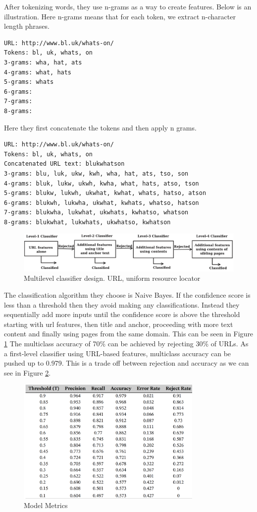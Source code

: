 \documentclass[12pt]{article}
\begin{document}
After tokenizing words, they use n-grams as a way to create features. Below is an illustration. Here n-grams means that for each token, we extract n-character length phrases.

\begin{verbatim}
URL: http://www.bl.uk/whats-on/
Tokens: bl, uk, whats, on
3-grams: wha, hat, ats
4-grams: what, hats
5-grams: whats
6-grams:
7-grams:
8-grams:
\end{verbatim}


Here they first concatenate the tokens and then apply n grams.

\begin{verbatim}
URL: http://www.bl.uk/whats-on/
Tokens: bl, uk, whats, on
Concatenated URL text: blukwhatson
3-grams: blu, luk, ukw, kwh, wha, hat, ats, tso, son
4-grams: bluk, lukw, ukwh, kwha, what, hats, atso, tson
5-grams: blukw, lukwh, ukwhat, kwhat, whats, hatso, atson
6-grams: blukwh, lukwha, ukwhat, kwhats, whatso, hatson
7-grams: blukwha, lukwhat, ukwhats, kwhatso, whatson
8-grams: blukwhat, lukwhats, ukwhatso, kwhatson
\end{verbatim}

\begin{figure}[ht!]
\center
\includegraphics[width=130mm]{rejection_method.png}
    \caption{Multilevel classifier design. URL, uniform resource locator}
    \label{reject}
\end{figure}


The classification algorithm they choose is Naive Bayes. If the confidence score is less than a threshold then they avoid making any classifications. Instead they sequentially add more inputs until the confidence score is above the threshold starting with url features, then title and anchor, proceeding with more text content and finally using pages from the same domain. This can be seen in Figure \ref{reject} The multiclass accuracy of 70\% can be achieved by rejecting 30\% of URLs. As a first-level classifier using URL-based features, multiclass accuracy can be pushed up to 0.979. This is a trade off between rejection and accuracy as we can see in Figure \ref{reject_acc}.

\begin{figure}[ht!]
\center
\includegraphics[width=90mm]{reject_acc.png}
    \caption{Model Metrics}
    \label{reject_acc}
\end{figure}
\end{document}
